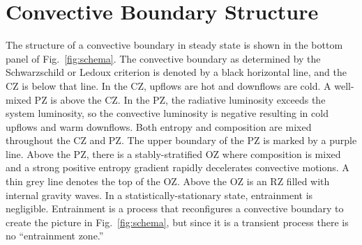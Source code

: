 \section{Convective Boundary Structure}
\label{sec:structure}
The structure of a convective boundary in steady state is shown in the bottom panel of Fig.~\ref{fig:schema}.
The convective boundary as determined by the Schwarzschild or Ledoux criterion is denoted by a black horizontal line, and the CZ is below that line.
In the CZ, upflows are hot and downflows are cold.
A well-mixed PZ is above the CZ.
In the PZ, the radiative luminosity exceeds the system luminosity, so the convective luminosity is negative resulting in cold upflows and warm downflows.
Both entropy and composition are mixed throughout the CZ and PZ.
The upper boundary of the PZ is marked by a purple line.
Above the PZ, there is a stably-stratified OZ where composition is mixed and a strong positive entropy gradient rapidly decelerates convective motions.
A thin grey line denotes the top of the OZ.
Above the OZ is an RZ filled with internal gravity waves.
In a statistically-stationary state, entrainment is negligible.
Entrainment is a process that reconfigures a convective boundary to create the picture in Fig.~\ref{fig:schema}, but since it is a transient process there is no ``entrainment zone.''
